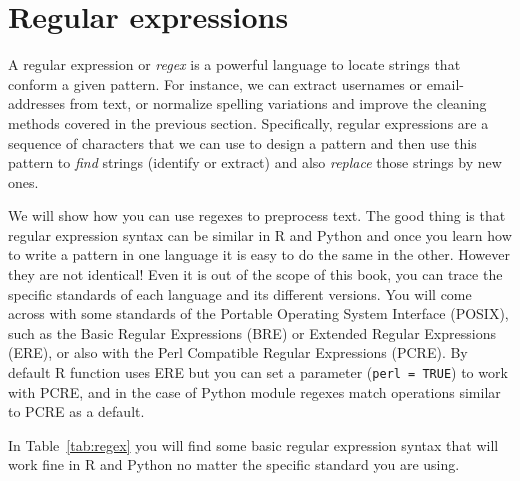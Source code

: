 \section{Regular expressions}
\label{sec:regular}

A regular expression or \emph{regex} is a powerful language to locate strings that conform a given pattern. For instance, we can extract usernames or email-addresses from text, or normalize spelling variations and improve the cleaning methods covered in the previous section. Specifically, regular expressions are a sequence of characters that we can use to design a pattern and then use this pattern to \emph{find} strings (identify or extract) and also \emph{replace} those strings by new ones. 

We will show how you can use regexes to preprocess text. The good thing is that regular expression syntax can be similar in R and Python and once you learn how to write a pattern in one language it is easy to do the same in the other.  However they are not identical! Even it is out of the scope of this book, you can trace the specific standards of each language and its different versions. You will come across with some standards of the Portable Operating System Interface (POSIX), such as the Basic Regular Expressions (BRE) or Extended Regular Expressions (ERE), or also with the Perl Compatible Regular Expressions (PCRE).  By default R function  uses ERE but you can set a parameter (\verb|perl = TRUE|) to work with PCRE, and in the case of Python  module regexes match operations similar to PCRE as a default.

In Table~\ref{tab:regex} you will find some basic regular expression syntax that will work fine in R and Python no matter the specific standard you are using.


\newcommand{\bs}[1]{\texttt{\textbackslash#1}}

